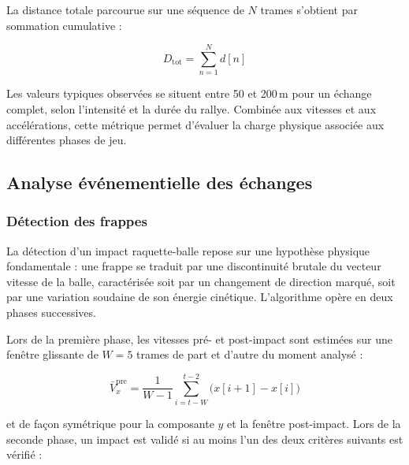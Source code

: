 La distance totale parcourue sur une séquence de $N$ trames s'obtient par sommation
cumulative :

\begin{equation}
  D_{\mathrm{tot}} = \sum_{n=1}^{N} d[n]
  \label{eq:distance_totale}
\end{equation}

Les valeurs typiques observées se situent entre 50 et 200\,m pour un échange complet, selon
l'intensité et la durée du rallye. Combinée aux vitesses et aux accélérations, cette métrique
permet d'évaluer la charge physique associée aux différentes phases de jeu.

\subsection{Analyse événementielle des échanges}

\subsubsection{Détection des frappes}

La détection d'un impact raquette-balle repose sur une hypothèse physique fondamentale : une
frappe se traduit par une discontinuité brutale du vecteur vitesse de la balle, caractérisée
soit par un changement de direction marqué, soit par une variation soudaine de son énergie
cinétique. L'algorithme opère en deux phases successives.

Lors de la première phase, les vitesses pré- et post-impact sont estimées sur une fenêtre
glissante de $W = 5$ trames de part et d'autre du moment analysé :

\begin{equation}
  \bar{V}^{\mathrm{pre}}_x = \frac{1}{W-1} \sum_{i=t-W}^{t-2} \bigl(x[i+1] - x[i]\bigr)
  \label{eq:vitesse_pre}
\end{equation}

et de façon symétrique pour la composante $y$ et la fenêtre post-impact. Lors de la seconde
phase, un impact est validé si au moins l'un des deux critères suivants est vérifié :

